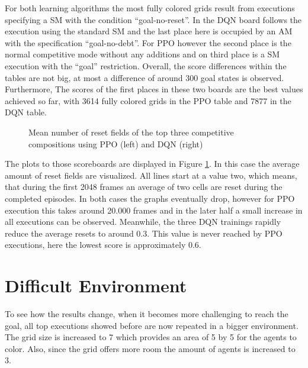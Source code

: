 For both learning algorithms the most fully colored grids result from executions specifying a SM with the condition ``goal-no-reset''. In the DQN board follows the execution using the standard SM and the last place here is occupied by an AM with the specification ``goal-no-debt''. For PPO however the second place is the normal competitive mode without any additions and on third place is a SM execution with the ``goal'' restriction. Overall, the score differences within the tables are not big, at most a difference of around 300 goal states is observed. Furthermore, The scores of the first places in these two boards are the best values achieved so far, with 3614 fully colored grids in the PPO table and 7877 in the DQN table.

\begin{figure}[hpbt]
    \centering
    \hspace{0.01\textwidth}
    \caption[Mean Number of Reset Fields of the Top Competitive Modes]{Mean number of reset fields of the top three competitive compositions using PPO (left) and DQN (right)}
    \label{fig:multipic_plots_comp_easy} %
\end{figure}

The plots to those scoreboards are displayed in Figure \ref{fig:multipic_plots_comp_easy}. In this case the average amount of reset fields are visualized. All lines start at a value two, which means, that during the first 2048 frames an average of two cells are reset during the completed episodes. In both cases the graphs eventually drop, however for PPO execution this takes around 20.000 frames and in the later half a small increase in all executions can be observed. Meanwhile, the three DQN trainings rapidly reduce the average resets to around 0.3. This value is never reached by PPO executions, here the lowest score is approximately 0.6.

\section{Difficult Environment} \label{difficult_env}
To see how the results change, when it becomes more challenging to reach the goal, all top executions showed before are now repeated in a bigger environment. The grid size is increased to 7 which provides an area of 5 by 5 for the agents to color. Also, since the grid offers more room the amount of agents is increased to 3.

